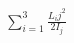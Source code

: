 \documentclass[preview]{standalone}
\begin{document}
\begin{align*}
\sum_{i=1}^3\frac{L_ij^2}{2I_j}
\end{align*}
\end{document}
